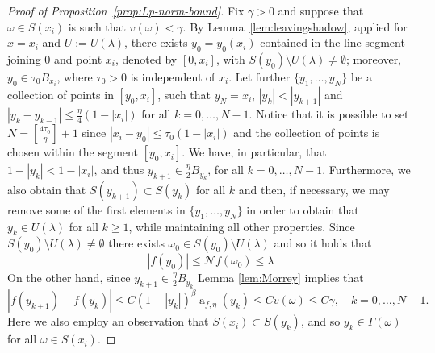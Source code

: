 \documentclass[11pt,a4paper,reqno]{amsart}
\theoremstyle{definition}
\renewcommand{\a}{\operatorname{a}}
\newcommand{\om}{\omega}
\newcommand{\Nm}{\mathcal{N}}
\numberwithin{komcounter}{section}
\begin{document}
\begin{proof}[Proof of Proposition~\ref{prop:Lp-norm-bound}]
	Fix $\gamma >0$ and suppose that $\om \in S(x_i)$ is such that $v(\om)<\gamma$. By Lemma~\ref{lem:leavingshadow}, applied for $x=x_i$ and $U:=U(\lambda)$, there exists $y_0=y_0(x_i)$ contained in the line segment joining $0$ and point $x_i$, denoted by $[0, x_i]$, with $S(y_0)\setminus U(\lambda )\neq\emptyset$; moreover, $y_0 \in\tau_0 B_{x_i}$, where $\tau_0>0$ is independent of $x_i$. Let further $\{y_1,\ldots, y_N\}$ be a collection of points in $[y_0, x_i]$, such that $y_N=x_i$, $|y_k|<|y_{k+1}|$ and $|y_{k}-y_{k-1}|\leq \frac{\eta}{4}(1-|x_i|)$ for all $k=0,\ldots, N-1$. Notice that it is possible to set $N=\left[\frac{4\tau_0}{\eta }\right] +1$ since $|x_i-y_0|\leq \tau_0 (1-|x_i|)$ and the collection of points is chosen within the segment $[y_0,x_i]$. We have, in particular, that $1-|y_k|< 1-|x_i|$, and thus $y_{k+1}\in \frac\eta 2B_{y_{k}}$,  for all $k=0,\ldots ,N-1$. Furthermore, we also obtain that $S(y_{k+1})\subset S(y_k)$ for all $k$ and then, if necessary, we may remove some of the first elements in $\{y_1,\ldots, y_N\}$ in order to obtain that $y_k\in U(\lambda)$ for all $k\geq 1$, while maintaining all other properties.
	Since $S(y_0) \setminus U(\lambda)\neq\emptyset$ there exists $\om_0\in S(y_0)\setminus U(\lambda )$ and so it holds that  
$$
 |f(y_0)|\leq \Nm f(\om_0)\leq \lambda
$$
 On the other hand, since $y_{k+1}\in \frac\eta 2 B_{y_{k}}$ Lemma \ref{lem:Morrey} implies that
$$
 |f(y_{k+1})-f(y_{k})|\leq C (1-|y_k|)^\beta \a_{f,\eta }(y_k)\leq C v(\om)\leq C \gamma, \quad k=0,\dots ,N-1.
$$
Here we also employ an observation that $S(x_i)\subset S(y_k)$, and so $y_k\in \Gamma (\omega )$ for all $\omega\in S(x_i)$.


\end{proof}
\end{document}
